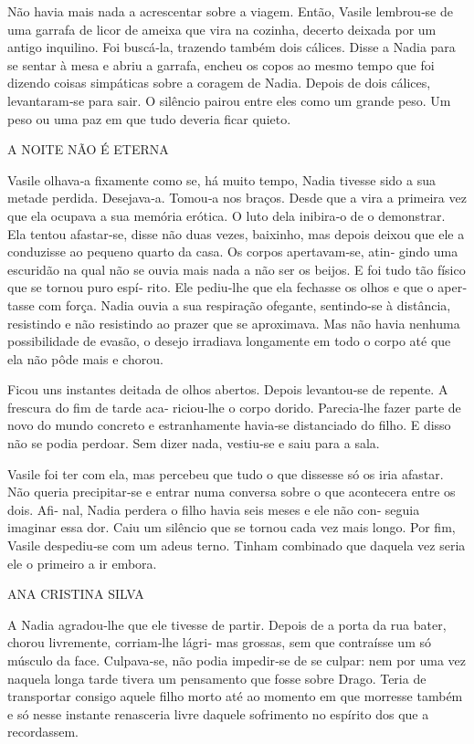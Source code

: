 Não havia mais nada a acrescentar sobre a viagem. Então, Vasile
lembrou‑se de uma garrafa de licor de ameixa que vira na cozinha,
decerto deixada por um antigo inquilino. Foi buscá‑la, trazendo também
dois cálices. Disse a Nadia para se sentar à mesa e abriu a garrafa,
encheu os copos ao mesmo tempo que foi dizendo coisas simpáticas sobre a
coragem de Nadia. Depois de dois cálices, levantaram‑se para sair. O
silêncio pairou entre eles como um grande peso. Um peso ou uma paz em
que tudo deveria ficar quieto.

A NOITE NÃO É ETERNA

Vasile olhava‑a fixamente como se, há muito tempo, Nadia tivesse sido a
sua metade perdida. Desejava‑a. Tomou‑a nos braços. Desde que a vira a
primeira vez que ela ocupava a sua memória erótica. O luto dela
inibira‑o de o demonstrar. Ela tentou afastar‑se, disse não duas vezes,
baixinho, mas depois deixou que ele a conduzisse ao pequeno quarto da
casa. Os corpos apertavam‑se, atin‑ gindo uma escuridão na qual não se
ouvia mais nada a não ser os beijos. E foi tudo tão físico que se tornou
puro espí‑ rito. Ele pediu‑lhe que ela fechasse os olhos e que o aper‑
tasse com força. Nadia ouvia a sua respiração ofegante, sentindo‑se à
distância, resistindo e não resistindo ao prazer que se aproximava. Mas
não havia nenhuma possibilidade de evasão, o desejo irradiava longamente
em todo o corpo até que ela não pôde mais e chorou.

Ficou uns instantes deitada de olhos abertos. Depois levantou‑se de
repente. A frescura do fim de tarde aca‑ riciou‑lhe o corpo dorido.
Parecia‑lhe fazer parte de novo do mundo concreto e estranhamente
havia‑se distanciado do filho. E disso não se podia perdoar. Sem dizer
nada, vestiu‑se e saiu para a sala.

Vasile foi ter com ela, mas percebeu que tudo o que dissesse só os iria
afastar. Não queria precipitar‑se e entrar numa conversa sobre o que
acontecera entre os dois. Afi‑ nal, Nadia perdera o filho havia seis
meses e ele não con‑ seguia imaginar essa dor. Caiu um silêncio que se
tornou cada vez mais longo. Por fim, Vasile despediu‑se com um adeus
terno. Tinham combinado que daquela vez seria ele o primeiro a ir
embora.

ANA CRISTINA SILVA

A Nadia agradou‑lhe que ele tivesse de partir. Depois de a porta da rua
bater, chorou livremente, corriam‑lhe lágri‑ mas grossas, sem que
contraísse um só músculo da face. Culpava‑se, não podia impedir‑se de se
culpar: nem por uma vez naquela longa tarde tivera um pensamento que
fosse sobre Drago. Teria de transportar consigo aquele filho morto até
ao momento em que morresse também e só nesse instante renasceria livre
daquele sofrimento no espírito dos que a recordassem.


